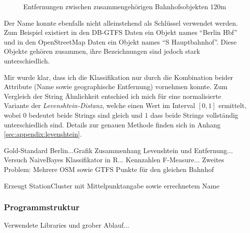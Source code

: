  \begin{figure}[htb]
   \centering
   \caption{Entfernungen zwischen zusammengehörigen Bahnhofsobjekten 120m}
   \label{fig:gtfs2osm:farLikelihood}
 \end{figure}
Der Name konnte ebenfalls nicht alleinstehend als Schlüssel verwendet werden. Zum Beispiel existiert in den DB-GTFS Daten ein Objekt names ``Berlin Hbf'' und in den OpenStreetMap Daten ein Objekt names ``S Hauptbahnhof''. Diese Objekte gehören zusammen, ihre Bezeichnungen sind jedoch stark unterschiedlich.

Mir wurde klar, dass ich die Klassifikation nur durch die Kombination beider Attribute (Name sowie geographische Entfernung) vornehmen konnte. Zum Vergleich der String Ähnlichkeit entschied ich mich für eine normalisierte Variante der \textit{Levenshtein-Distanz}, welche einen Wert im Interval $[0,1]$ ermittelt, wobei $0$ bedeutet beide Strings sind gleich und $1$ dass beide Strings vollständig unterschiedlich sind. Details zur genauen Methode finden sich in Anhang \ref{sec:appendix:levenshtein}.



Gold-Standard Berlin...Grafik Zusammenhang Levenshtein und Entfernung...
Versuch NaiveBayes Klassifikator in R... Kennzahlen F-Measure...
Zweites Problem: Mehrere OSM sowie GTFS Punkte für den gleichen Bahnhof

Erzeugt StationCluster mit Mittelpunktangabe sowie errechnetem Name

\subsubsection{Programmstruktur}

Verwendete Libraries und grober Ablauf...

